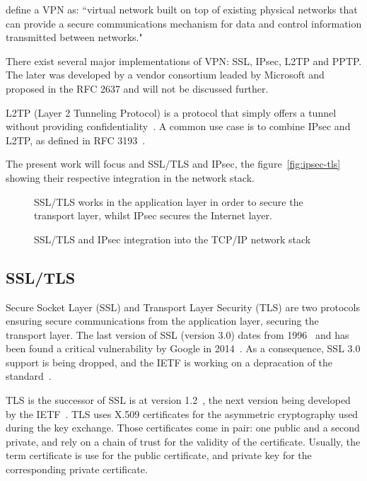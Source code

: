 \citet{Frankel:2005:SGI:2206289} define a VPN as: ``virtual network built on top of existing physical networks that can provide a
secure communications mechanism for data and control information transmitted between networks."

There exist several major implementations of VPN: SSL, IPsec, L2TP and PPTP.
The later was developed by a vendor consortium leaded by Microsoft and proposed in the RFC 2637 and will not be discussed further.

\noindent L2TP (Layer 2 Tunneling Protocol) is a protocol that simply offers a tunnel without providing confidentiality~\cite{rfc3931}.
A common use case is to combine IPsec and L2TP, as defined in RFC 3193~\cite{rfc3193}.\newline{}

The present work will focus and SSL/TLS and IPsec, the figure~\ref{fig:ipsec-tls} showing their respective integration in the network stack.

\begin{figure}[ht]
\center

\caption{SSL/TLS and IPsec integration into the TCP/IP network stack}{SSL/TLS works in the application layer in order to secure the transport layer, whilst IPsec secures the Internet layer.}
\label{fig:tls-ipsec}
\end{figure}

\subsection{SSL/TLS}
Secure Socket Layer (SSL) and Transport Layer Security (TLS) are two protocols ensuring secure communications from the application layer, securing the transport layer.
The last version of SSL (version 3.0) dates from 1996~\cite{rfc6101} and has been found a critical vulnerability by Google in 2014~\cite{poodle}.
As a consequence, SSL 3.0 support is being dropped, and the IETF is working on a depracation of the standard~\cite{sslv3-diediedie-03}.

\noindent TLS is the successor of SSL is at version 1.2~\cite{rfc5246}, the next version being developed by the IETF~\cite{tls13-05}.
TLS uses X.509 certificates for the asymmetric cryptography used during the key exchange.
Those certificates come in pair: one public and a second private, and rely on a chain of trust for the validity of the certificate.
Usually, the term certificate is use for the public certificate, and private key for the corresponding private certificate.

